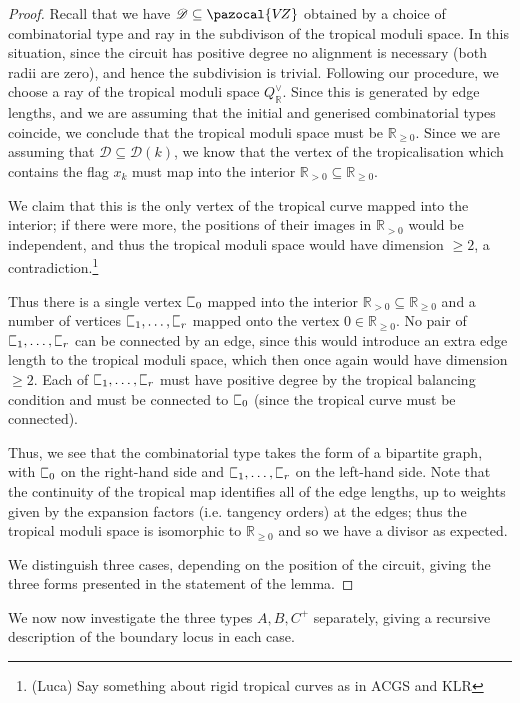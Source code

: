 \documentclass[11pt]{amsart}
\newcommand{\sqC}{\scalebox{0.8}[1.3]{$\sqsubset$}}
\newcommand{\VZ}{\pazocal{V\!Z}}
\newcommand{\Dcal}{\mathcal{D}}
\newcommand{\RR}{\mathbb{R}}
\theoremstyle{definition}
\theoremstyle{definition}
\begin{document}
\begin{proof}
Recall that we have $\Dcal\subseteq\VZ$ obtained by a choice of combinatorial type and ray in the subdivison of the tropical moduli space. In this situation, since the circuit has positive degree no alignment is necessary (both radii are zero), and hence the subdivision is trivial. Following our procedure, we choose a ray of the tropical moduli space $Q^\vee_{\RR}$. Since this is generated by edge lengths, and we are assuming that the initial and generised combinatorial types coincide, we conclude that the tropical moduli space must be $\RR_{\geq 0}$. Since we are assuming that $\Dcal \subseteq \Dcal(k)$, we know that the vertex of the tropicalisation which contains the flag $x_k$ must map into the interior $\RR_{>0}\subseteq \RR_{\geq 0}$.

We claim that this is the only vertex of the tropical curve mapped into the interior; if there were more, the positions of their images in $\RR_{> 0}$ would be independent, and thus the tropical moduli space would have dimension $\geq 2$, a contradiction.\footnote{(Luca) Say something about rigid tropical curves as in ACGS and KLR}

Thus there is a single vertex $\sqC_0$ mapped into the interior $\RR_{>0} \subseteq \RR_{\geq 0}$ and a number of vertices $\sqC_1,\ldots,\sqC_r$ mapped onto the vertex $0 \in \RR_{\geq 0}$. No pair of $\sqC_1,\ldots,\sqC_r$ can be connected by an edge, since this would introduce an extra edge length to the tropical moduli space, which then once again would have dimension $\geq 2$. Each of $\sqC_1,\ldots,\sqC_r$ must have positive degree by the tropical balancing condition and must be connected to $\sqC_0$ (since the tropical curve must be connected).

Thus, we see that the combinatorial type takes the form of a bipartite graph, with $\sqC_0$ on the right-hand side and $\sqC_1,\ldots,\sqC_r$ on the left-hand side. Note that the continuity of the tropical map identifies all of the edge lengths, up to weights given by the expansion factors (i.e. tangency orders) at the edges; thus the tropical moduli space is isomorphic to $\RR_{\geq 0}$ and so we have a divisor as expected.

We distinguish three cases, depending on the position of the circuit, giving the three forms presented in the statement of the lemma.\end{proof}

We now now investigate the three types $A,B,C^+$ separately, giving a recursive description of the boundary locus in each case.
\end{document}
